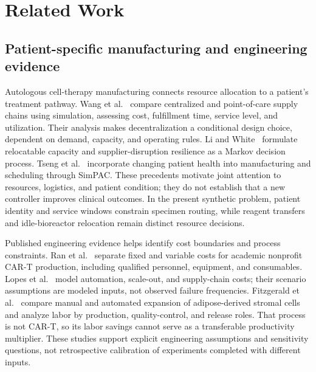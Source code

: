 \section{Related Work}
\label{sec:related-work}

\subsection{Patient-specific manufacturing and engineering evidence}
Autologous cell-therapy manufacturing connects resource allocation to a patient's treatment pathway. Wang et al.~\cite{Wang2023} compare centralized and point-of-care supply chains using simulation, assessing cost, fulfillment time, service level, and utilization. Their analysis makes decentralization a conditional design choice, dependent on demand, capacity, and operating rules. Li and White~\cite{Li2023} formulate relocatable capacity and supplier-disruption resilience as a Markov decision process. Tseng et al.~\cite{Tseng2024PatientHealth} incorporate changing patient health into manufacturing and scheduling through SimPAC. These precedents motivate joint attention to resources, logistics, and patient condition; they do not establish that a new controller improves clinical outcomes. In the present synthetic problem, patient identity and service windows constrain specimen routing, while reagent transfers and idle-bioreactor relocation remain distinct resource decisions.

Published engineering evidence helps identify cost boundaries and process constraints. Ran et al.~\cite{Ran2020} separate fixed and variable costs for academic nonprofit CAR-T production, including qualified personnel, equipment, and consumables. Lopes et al.~\cite{Lopes2020} model automation, scale-out, and supply-chain costs; their scenario assumptions are modeled inputs, not observed failure frequencies. Fitzgerald et al.~\cite{Fitzgerald2022} compare manual and automated expansion of adipose-derived stromal cells and analyze labor by production, quality-control, and release roles. That process is not CAR-T, so its labor savings cannot serve as a transferable productivity multiplier. These studies support explicit engineering assumptions and sensitivity questions, not retrospective calibration of experiments completed with different inputs.

